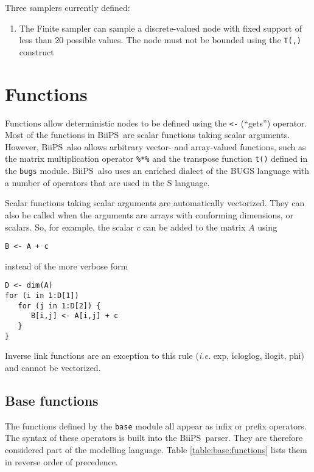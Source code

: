 \documentclass[11pt, a4paper, titlepage]{report}
\newcommand{\biips}{\textsf{BiiPS}}
\begin{document}
Three samplers currently defined:
\begin{enumerate}
\item The Finite sampler can sample a discrete-valued node with
fixed support of less than 20 possible values. The node must not
be bounded using the \verb+T(,)+ construct
\end{enumerate}

\chapter{Functions}
\label{section:functions}

Functions allow deterministic nodes to be defined using the \verb+<-+
(``gets'') operator.  Most of the functions in \biips\ are scalar
functions taking scalar arguments. However, \biips\ also allows
arbitrary vector- and array-valued functions, such as the matrix
multiplication operator \verb+%*%+ and the transpose function
\verb+t()+ defined in the \verb+bugs+ module.
\biips\ also uses an enriched dialect of the BUGS language with
a number of operators that are used in the S language.

Scalar functions taking scalar arguments are automatically vectorized.
They can also be called when the arguments are arrays with conforming
dimensions, or scalars. So, for example, the scalar $c$ can be added to
the matrix $A$ using
\begin{verbatim}
B <- A + c
\end{verbatim}
instead of the more verbose form
\begin{verbatim}
D <- dim(A)
for (i in 1:D[1])
   for (j in 1:D[2]) {
      B[i,j] <- A[i,j] + c
   }
}
\end{verbatim}
Inverse link functions are an exception to this rule ({\em i.e.} exp,
icloglog, ilogit, phi) and cannot be vectorized. 

\section{Base functions}
\label{section:functions:base}

The functions defined by the \verb+base+ module all appear as infix or
prefix operators. The syntax of these operators is built into the
\biips\ parser. They are therefore considered part of the modelling
language.  Table \ref{table:base:functions} lists them in reverse
order of precedence.
\end{document}
